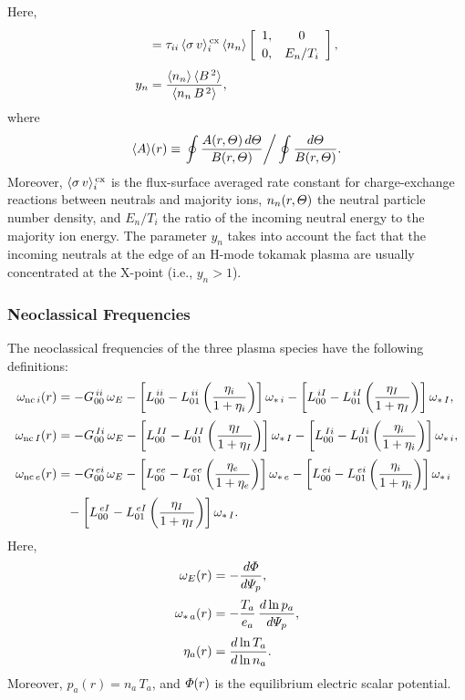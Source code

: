 \documentclass[12pt,prb,aps]{revtex4-1}
\begin{document}
Here,\,\cite{mon}
\begin{align}
[Y^{\,in}] &= \tau_{ii}\,\langle \sigma\,v\rangle_i^{\,\rm cx}
\,\langle n_n\rangle\left[
\begin{array}{cc} 1,& 0\\[0.5ex]0,&E_n/T_i\end{array}
\right],\\[0.5ex]
y_n &= \frac{\langle n_n\rangle\,\langle B^{\,2}\rangle}{\langle
n_n\,B^{\,2}\rangle},
\end{align}
where
\begin{equation}
\langle A\rangle (r) \equiv\left.\oint \frac{A(r,{\mit\Theta})\,d{\mit\Theta}}{B(r,{\mit\Theta})}\right/\oint \frac{d{\mit\Theta}}{B(r,{\mit\Theta})}.
\end{equation}
Moreover, $\langle \sigma\,v\rangle_i^{\,\rm cx}$ is the flux-surface
averaged rate constant for charge-exchange reactions between neutrals and majority ions, $n_n(r,{\mit\Theta})$  the
neutral particle number density, and $E_n/T_i$ the ratio of the incoming neutral energy to the majority ion energy. The parameter
$y_n$ takes into account the fact that the incoming neutrals at the
edge of an H-mode tokamak plasma are usually
concentrated at the X-point (i.e., $y_n>1$).

\subsubsection{Neoclassical Frequencies}\label{sneo}
The neoclassical frequencies of the three plasma species have the following definitions:
\begin{align}
\omega_{{\rm nc}\,i}(r)&=-G_{00}^{\,ii}\,\omega_E -\left[L^{\,ii}_{00}-L^{\,ii}_{01}\left(\frac{\eta_i}{1+\eta_i}\right)\right]\omega_{\ast\,i}-
\left[L^{\,iI}_{00}-L^{\,iI}_{01}\left(\frac{\eta_I}{1+\eta_I}\right)\right]\omega_{\ast\,I},\\[0.5ex]
\omega_{{\rm nc}\,I}(r)&=-G_{00}^{\,Ii}\,\omega_E -\left[L^{\,II}_{00}-L^{\,II}_{01}\left(\frac{\eta_I}{1+\eta_I}\right)\right]\omega_{\ast\,I}-
\left[L^{\,Ii}_{00}-L^{\,Ii}_{01}\left(\frac{\eta_i}{1+\eta_i}\right)\right]\omega_{\ast\,i},\\[0.5ex]
\omega_{{\rm nc}\,e}(r)&=-G_{00}^{\,ei}\,\omega_E -\left[L^{\,ee}_{00}-L^{\,ee}_{01}\left(\frac{\eta_e}{1+\eta_e}\right)\right]\omega_{\ast\,e}-
\left[L^{\,ei}_{00}-L^{\,ei}_{01}\left(\frac{\eta_i}{1+\eta_i}\right)\right]\omega_{\ast\,i}\nonumber\\[0.5ex]
&\phantom{=}-
\left[L^{\,eI}_{00}-L^{\,eI}_{01}\left(\frac{\eta_I}{1+\eta_I}\right)\right]\omega_{\ast\,I}.
\end{align}
Here,
\begin{align}
\omega_E(r) &=-\frac{d{\mit\Phi}}{d{\mit\Psi}_p},\\[0.5ex]
\omega_{\ast\,a}(r) &= -\frac{T_a}{e_a}\,\frac{d\ln p_a}{d{\mit\Psi}_p},\\[0.5ex]
\eta_a(r) &= \frac{d\ln T_a}{d\ln n_a}.
\end{align}
Moreover, $p_a(r)=n_a\,T_a$, and ${\mit\Phi}(r)$ is the equilibrium electric scalar potential. 
\end{document}
